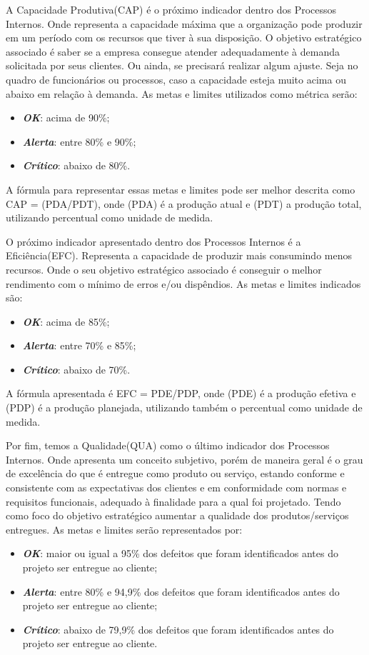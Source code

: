 \documentclass[
	12pt,				%
	openright,			%
	oneside,			%
	a4paper,			%
	english,			%
	brazil				%
	]{abntex2}
\begin{document}
A Capacidade Produtiva(CAP) é o próximo indicador dentro dos Processos Internos. Onde representa a capacidade máxima que a organização pode produzir em um período com os recursos que tiver à sua disposição. O objetivo estratégico associado é saber se a empresa consegue atender adequadamente à demanda solicitada por seus clientes. Ou ainda, se precisará realizar algum ajuste. Seja no quadro de funcionários ou processos, caso a capacidade esteja muito acima ou abaixo em relação à demanda. As metas e limites utilizados como métrica serão:
\begin{itemize}
\item  \textbf{\textit{OK}}: acima de 90\%;
\item  \textbf{\textit{Alerta}}: entre 80\% e 90\%;
\item  \textbf{\textit{Crítico}}: abaixo de 80\%.
\end{itemize}

A fórmula para representar essas metas e limites pode ser melhor descrita como CAP = (PDA/PDT), onde (PDA) é a produção atual e (PDT) a produção total, utilizando percentual como unidade de medida.

O próximo indicador apresentado dentro dos Processos Internos é a Eficiência(EFC). Representa a capacidade de produzir mais consumindo menos recursos. Onde o seu objetivo estratégico associado é conseguir o melhor rendimento com o mínimo de erros e/ou dispêndios. As metas e limites indicados são:
\begin{itemize}
\item  \textbf{\textit{OK}}: acima de 85\%;
\item  \textbf{\textit{Alerta}}: entre 70\% e 85\%;
\item  \textbf{\textit{Crítico}}: abaixo de 70\%.
\end{itemize}

A fórmula apresentada é EFC = PDE/PDP, onde (PDE) é a produção efetiva e (PDP) é a produção planejada, utilizando também o percentual como unidade de medida.

Por fim, temos a Qualidade(QUA) como o último indicador dos Processos Internos. Onde apresenta um conceito subjetivo, porém de maneira geral é o grau de excelência do que é entregue como produto ou serviço, estando conforme e consistente com as expectativas dos clientes e em conformidade com normas e requisitos funcionais, adequado à finalidade para a qual foi projetado. Tendo como foco do objetivo estratégico aumentar a qualidade dos produtos/serviços entregues. As metas e limites serão representados por: 
\begin{itemize}
\item  \textbf{\textit{OK}}: maior ou igual a 95\% dos defeitos que foram identificados antes do projeto ser entregue ao cliente;
\item  \textbf{\textit{Alerta}}: entre 80\% e 94,9\% dos defeitos que foram identificados antes do projeto ser entregue ao cliente;
\item  \textbf{\textit{Crítico}}: abaixo de 79,9\% dos defeitos que foram identificados antes do projeto ser entregue ao cliente.
\end{itemize}
\end{document}
